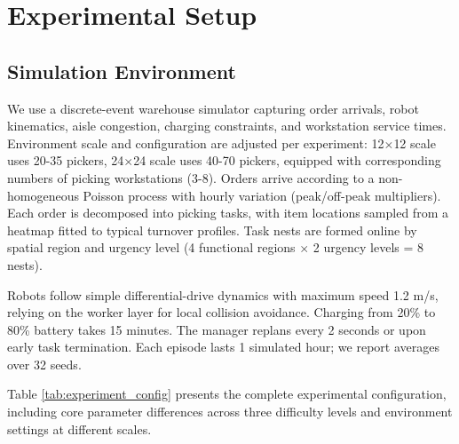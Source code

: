 \documentclass[12pt,a4paper]{article}
\begin{document}
\section{Experimental Setup}

\subsection{Simulation Environment}

We use a discrete-event warehouse simulator capturing order arrivals, robot kinematics, aisle congestion, charging constraints, and workstation service times. Environment scale and configuration are adjusted per experiment: 12$\times$12 scale uses 20-35 pickers, 24$\times$24 scale uses 40-70 pickers, equipped with corresponding numbers of picking workstations (3-8). Orders arrive according to a non-homogeneous Poisson process with hourly variation (peak/off-peak multipliers). Each order is decomposed into picking tasks, with item locations sampled from a heatmap fitted to typical turnover profiles. Task nests are formed online by spatial region and urgency level (4 functional regions $\times$ 2 urgency levels = 8 nests).

Robots follow simple differential-drive dynamics with maximum speed 1.2 m/s, relying on the worker layer for local collision avoidance. Charging from 20\% to 80\% battery takes 15 minutes. The manager replans every 2 seconds or upon early task termination. Each episode lasts 1 simulated hour; we report averages over 32 seeds.

Table \ref{tab:experiment_config} presents the complete experimental configuration, including core parameter differences across three difficulty levels and environment settings at different scales.
\end{document}
